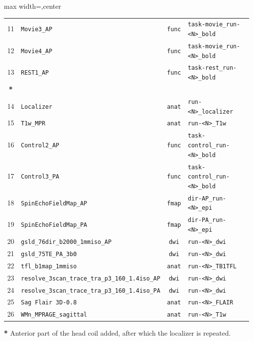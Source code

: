 \begin{table}[htbp]
\begin{adjustbox}{max width=\textwidth,center}
\begin{tabular}{@{}c l c l@{}}
11 & \texttt{Movie3\_AP} & \texttt{func} & \texttt{task-movie\_run-\textless{}N\textgreater{}\_bold} \\
\rowcolor{tablealt}
12 & \texttt{Movie4\_AP} & \texttt{func} & \texttt{task-movie\_run-\textless{}N\textgreater{}\_bold} \\
13 & \texttt{REST1\_AP} & \texttt{func} & \texttt{task-rest\_run-\textless{}N\textgreater{}\_bold} \\
\midrule
\textbf{*} & & & \\
\midrule
\rowcolor{tablealt}
14 & \texttt{Localizer} & \texttt{anat} & \texttt{run-\textless{}N\textgreater{}\_localizer} \\
15 & \texttt{T1w\_MPR} & \texttt{anat} & \texttt{run-\textless{}N\textgreater{}\_T1w} \\
\rowcolor{tablealt}
16 & \texttt{Control2\_AP} & \texttt{func} & \texttt{task-control\_run-\textless{}N\textgreater{}\_bold} \\
17 & \texttt{Control3\_PA} & \texttt{func} & \texttt{task-control\_run-\textless{}N\textgreater{}\_bold} \\
\rowcolor{tablealt}
18 & \texttt{SpinEchoFieldMap\_AP} & \texttt{fmap} & \texttt{dir-AP\_run-\textless{}N\textgreater{}\_epi} \\
19 & \texttt{SpinEchoFieldMap\_PA} & \texttt{fmap} & \texttt{dir-PA\_run-\textless{}N\textgreater{}\_epi} \\
\rowcolor{tablealt}
20 & \texttt{gsld\_76dir\_b2000\_1mmiso\_AP} & \texttt{dwi} & \texttt{run-\textless{}N\textgreater{}\_dwi} \\
21 & \texttt{gsld\_75TE\_PA\_3b0} & \texttt{dwi} & \texttt{run-\textless{}N\textgreater{}\_dwi} \\
\rowcolor{tablealt}
22 & \texttt{tfl\_b1map\_1mmiso} & \texttt{anat} & \texttt{run-\textless{}N\textgreater{}\_TB1TFL} \\
23 & \texttt{resolve\_3scan\_trace\_tra\_p3\_160\_1.4iso\_AP} & \texttt{dwi} & \texttt{run-\textless{}N\textgreater{}\_dwi} \\
\rowcolor{tablealt}
24 & \texttt{resolve\_3scan\_trace\_tra\_p3\_160\_1.4iso\_PA} & \texttt{dwi} & \texttt{run-\textless{}N\textgreater{}\_dwi} \\
25 & \texttt{Sag Flair 3D-0.8} & \texttt{anat} & \texttt{run-\textless{}N\textgreater{}\_FLAIR} \\
\rowcolor{tablealt}
26 & \texttt{WMn\_MPRAGE\_sagittal} & \texttt{anat} & \texttt{run-\textless{}N\textgreater{}\_T1w} \\
\bottomrule
\end{tabular}
\end{adjustbox}

\vspace{4pt}
\begin{flushleft}
\footnotesize
\textbf{*} Anterior part of the head coil added, after which the localizer is repeated.
\end{flushleft}
\end{table}
